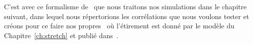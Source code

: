 \documentclass[../main/main.tex]{subfiles}
\begin{document}
C'est avec ce formalisme de \bbc\ que nous traitons nos simulations dans le
chapitre suivant, dans lequel nous répertorions les corrélations que nous
voulons tester et créons pour ce faire nos propres \hostlib\ où l'étirement est
donné par le modèle du Chapitre~\ref{ch:stretch} et publié
dans~\cite{nicolas2021}.

\clearpage

\thispagestyle{plain}
\vfill
\minilof
\vfill
\minilot
\vfill

% 
% 
\end{document}
